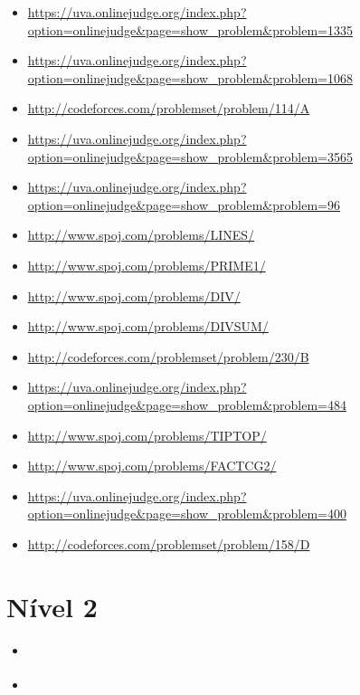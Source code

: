 \begin{itemize}
\item \url{https://uva.onlinejudge.org/index.php?option=onlinejudge&page=show_problem&problem=1335}
\item \url{https://uva.onlinejudge.org/index.php?option=onlinejudge&page=show_problem&problem=1068}
\item \url{http://codeforces.com/problemset/problem/114/A}
\item \url{https://uva.onlinejudge.org/index.php?option=onlinejudge&page=show_problem&problem=3565}
\item \url{https://uva.onlinejudge.org/index.php?option=onlinejudge&page=show_problem&problem=96}
\item \url{http://www.spoj.com/problems/LINES/}
\item \url{http://www.spoj.com/problems/PRIME1/}
\item \url{http://www.spoj.com/problems/DIV/}
\item \url{http://www.spoj.com/problems/DIVSUM/}
\item \url{http://codeforces.com/problemset/problem/230/B}
\item \url{https://uva.onlinejudge.org/index.php?option=onlinejudge&page=show_problem&problem=484}
\item \url{http://www.spoj.com/problems/TIPTOP/}
\item \url{http://www.spoj.com/problems/FACTCG2/}
\item \url{https://uva.onlinejudge.org/index.php?option=onlinejudge&page=show_problem&problem=400}
\item \url{http://codeforces.com/problemset/problem/158/D}
\end{itemize}


\section{Nível 2}

\begin{itemize}
\item \url{}
\item \url{}
\end{itemize}


